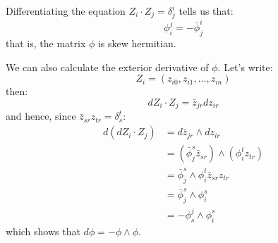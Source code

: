 Differentiating the equation $ Z_i \cdot Z_j = \delta^i_j $ tells us that:
%
$$ \phi^j_i = - \bar{\phi}^i_j $$
%
that is, the matrix $\phi$ is skew hermitian. 

We can also calculate the exterior derivative of $\phi$.  Let's write:
%
$$ Z_i = ( z_{i0}, z_{i1}, \ldots, z_{in} ) $$
%
then:
%
$$ d Z_i \cdot Z_j = \bar{z}_{jr} d z_{ir} $$
%
and hence, since $\bar{z}_{sr} z_{tr} = \delta^t_s$:
%
\begin{align*}
d( d Z_i \cdot Z_j ) &= d \bar{z}_{jr} \wedge d z_{ir} \\
&= ( \bar{\phi}^s_j \bar{z}_{sr} ) \wedge ( \phi^t_i z_{tr} ) \\
&= \bar{\phi}^s_j \wedge \phi^t_i \bar{z}_{sr}  z_{tr} \\
&= \bar{\phi}^s_j \wedge \phi^s_i \\
&= - \phi^j_s \wedge \phi^s_i
\end{align*}
%
which shows that $d \phi = - \phi \wedge \phi $.   

